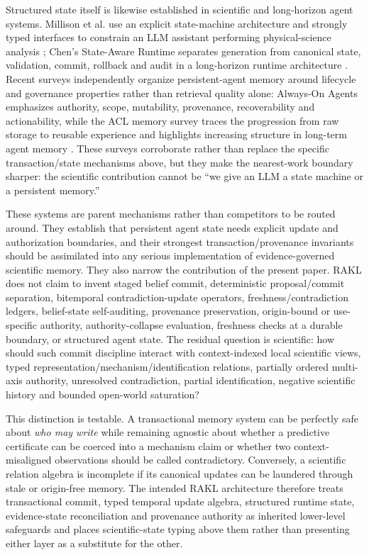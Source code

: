 \documentclass[11pt]{article}
\begin{document}
Structured state itself is likewise established in scientific and long-horizon agent systems. Millison et al. use an explicit state-machine architecture and strongly typed interfaces to constrain an LLM assistant performing physical-science analysis \cite{millison2026}; Chen's State-Aware Runtime separates generation from canonical state, validation, commit, rollback and audit in a long-horizon runtime architecture \cite{chen2026stateaware}. Recent surveys independently organize persistent-agent memory around lifecycle and governance properties rather than retrieval quality alone: Always-On Agents emphasizes authority, scope, mutability, provenance, recoverability and actionability, while the ACL memory survey traces the progression from raw storage to reusable experience and highlights increasing structure in long-term agent memory \cite{ding2026alwayson,luo2026memorysurvey}. These surveys corroborate rather than replace the specific transaction/state mechanisms above, but they make the nearest-work boundary sharper: the scientific contribution cannot be ``we give an LLM a state machine or a persistent memory.''

These systems are parent mechanisms rather than competitors to be routed around. They establish that persistent agent state needs explicit update and authorization boundaries, and their strongest transaction/provenance invariants should be assimilated into any serious implementation of evidence-governed scientific memory. They also narrow the contribution of the present paper. RAKL does not claim to invent staged belief commit, deterministic proposal/commit separation, bitemporal contradiction-update operators, freshness/contradiction ledgers, belief-state self-auditing, provenance preservation, origin-bound or use-specific authority, authority-collapse evaluation, freshness checks at a durable boundary, or structured agent state. The residual question is scientific: how should such commit discipline interact with context-indexed local scientific views, typed representation/mechanism/identification relations, partially ordered multi-axis authority, unresolved contradiction, partial identification, negative scientific history and bounded open-world saturation?

This distinction is testable. A transactional memory system can be perfectly safe about \emph{who may write} while remaining agnostic about whether a predictive certificate can be coerced into a mechanism claim or whether two context-misaligned observations should be called contradictory. Conversely, a scientific relation algebra is incomplete if its canonical updates can be laundered through stale or origin-free memory. The intended RAKL architecture therefore treats transactional commit, typed temporal update algebra, structured runtime state, evidence-state reconciliation and provenance authority as inherited lower-level safeguards and places scientific-state typing above them rather than presenting either layer as a substitute for the other.
\end{document}
